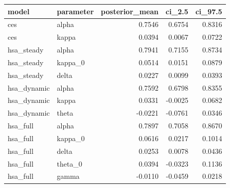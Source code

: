 \begin{tabular}{llrrr}
\toprule
model & parameter & posterior\_mean & ci\_2.5 & ci\_97.5 \\
\midrule
ces & alpha & 0.7546 & 0.6754 & 0.8316 \\
ces & kappa & 0.0394 & 0.0067 & 0.0722 \\
hsa\_steady & alpha & 0.7941 & 0.7155 & 0.8734 \\
hsa\_steady & kappa\_0 & 0.0514 & 0.0151 & 0.0879 \\
hsa\_steady & delta & 0.0227 & 0.0099 & 0.0393 \\
hsa\_dynamic & alpha & 0.7592 & 0.6798 & 0.8355 \\
hsa\_dynamic & kappa & 0.0331 & -0.0025 & 0.0682 \\
hsa\_dynamic & theta & -0.0221 & -0.0761 & 0.0346 \\
hsa\_full & alpha & 0.7897 & 0.7058 & 0.8670 \\
hsa\_full & kappa\_0 & 0.0616 & 0.0217 & 0.1014 \\
hsa\_full & delta & 0.0253 & 0.0078 & 0.0436 \\
hsa\_full & theta\_0 & 0.0394 & -0.0323 & 0.1136 \\
hsa\_full & gamma & -0.0110 & -0.0459 & 0.0218 \\
\bottomrule
\end{tabular}
